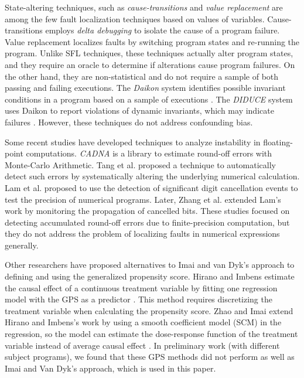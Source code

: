 \documentclass[times]{stvrauth}
\begin{document}
State-altering techniques, such as {\it cause-transitions} \cite{Cleve2005} and {\it value replacement} \cite{Jeffrey2008} are among the few fault localization techniques based on values of variables.  Cause-transitions employs {\it delta debugging} \cite{Zeller2002} to isolate the cause of a program failure. Value replacement localizes faults by switching program states and re-running the program. Unlike SFL techniques, these techniques actually alter program states, and they require an oracle to determine if alterations cause program failures. On the other hand, they are non-statistical and do not require a sample of both passing and failing executions. The {\it Daikon} system identifies possible invariant conditions in a program based on a sample of executions \cite{Ernst2007}. The {\it DIDUCE} system uses Daikon to report violations of dynamic invariants, which may indicate failures \cite{Hangal2002}. However, these techniques do not address confounding bias.


Some recent studies have developed techniques to analyze instability in floating-point computations. {\it CADNA} \cite{Scott2007} is a library to estimate round-off errors with Monte-Carlo Arithmetic. Tang et al. \cite{Tang2010} proposed a technique to automatically detect such errors by systematically altering the underlying numerical calculation. Lam et al. \cite{Lam2013} proposed to use the detection of significant digit cancellation events to test the precision of numerical programs.  Later, Zhang et al. \cite{Bao2013} extended Lam's work by monitoring the propagation of cancelled bits.  These studies focused on detecting accumulated round-off errors due to finite-precision computation, but they do not address the problem of localizing faults in numerical expressions generally.


Other researchers have proposed alternatives to Imai and van Dyk's approach to defining and using the generalized propensity score.  Hirano and Imbens estimate the causal effect of a continuous treatment variable by fitting one regression model with the GPS as a predictor \cite{Hirano2004}. This method requires discretizing the treatment variable when calculating the propensity score.  Zhao and Imai extend Hirano and Imbens's work by using a smooth coefficient model (SCM) in the regression, so the model can estimate the dose-response function of the treatment variable instead of average causal effect \cite{Zhao2013}.  In preliminary work (with different subject programs), we found that these GPS methods did not perform as well as Imai and Van Dyk's approach, which is used in this paper.
\end{document}
